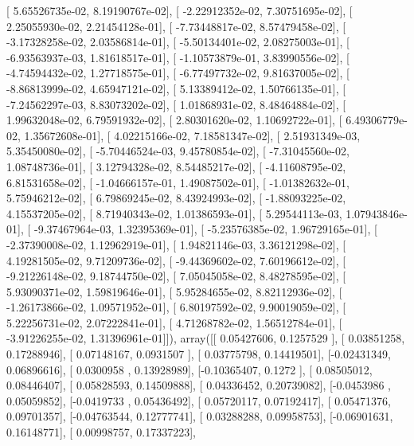 \documentclass{article}
\begin{document}
       [  5.65526735e-02,   8.19190767e-02],
       [ -2.22912352e-02,   7.30751695e-02],
       [  2.25055930e-02,   2.21454128e-01],
       [ -7.73448817e-02,   8.57479458e-02],
       [ -3.17328258e-02,   2.03586814e-01],
       [ -5.50134401e-02,   2.08275003e-01],
       [ -6.93563937e-03,   1.81618517e-01],
       [ -1.10573879e-01,   3.83990556e-02],
       [ -4.74594432e-02,   1.27718575e-01],
       [ -6.77497732e-02,   9.81637005e-02],
       [ -8.86813999e-02,   4.65947121e-02],
       [  5.13389412e-02,   1.50766135e-01],
       [ -7.24562297e-03,   8.83073202e-02],
       [  1.01868931e-02,   8.48464884e-02],
       [  1.99632048e-02,   6.79591932e-02],
       [  2.80301620e-02,   1.10692722e-01],
       [  6.49306779e-02,   1.35672608e-01],
       [  4.02215166e-02,   7.18581347e-02],
       [  2.51931349e-03,   5.35450080e-02],
       [ -5.70446524e-03,   9.45780854e-02],
       [ -7.31045560e-02,   1.08748736e-01],
       [  3.12794328e-02,   8.54485217e-02],
       [ -4.11608795e-02,   6.81531658e-02],
       [ -1.04666157e-01,   1.49087502e-01],
       [ -1.01382632e-01,   5.75946212e-02],
       [  6.79869245e-02,   8.43924993e-02],
       [ -1.88093225e-02,   4.15537205e-02],
       [  8.71940343e-02,   1.01386593e-01],
       [  5.29544113e-03,   1.07943846e-01],
       [ -9.37467964e-03,   1.32395369e-01],
       [ -5.23576385e-02,   1.96729165e-01],
       [ -2.37390008e-02,   1.12962919e-01],
       [  1.94821146e-03,   3.36121298e-02],
       [  4.19281505e-02,   9.71209736e-02],
       [ -9.44369602e-02,   7.60196612e-02],
       [ -9.21226148e-02,   9.18744750e-02],
       [  7.05045058e-02,   8.48278595e-02],
       [  5.93090371e-02,   1.59819646e-01],
       [  5.95284655e-02,   8.82112936e-02],
       [ -1.26173866e-02,   1.09571952e-01],
       [  6.80197592e-02,   9.90019059e-02],
       [  5.22256731e-02,   2.07222841e-01],
       [  4.71268782e-02,   1.56512784e-01],
       [ -3.91226255e-02,   1.31396961e-01]]), array([[ 0.05427606,  0.1257529 ],
       [ 0.03851258,  0.17288946],
       [ 0.07148167,  0.0931507 ],
       [ 0.03775798,  0.14419501],
       [-0.02431349,  0.06896616],
       [ 0.0300958 ,  0.13928989],
       [-0.10365407,  0.1272    ],
       [ 0.08505012,  0.08446407],
       [ 0.05828593,  0.14509888],
       [ 0.04336452,  0.20739082],
       [-0.0453986 ,  0.05059852],
       [-0.0419733 ,  0.05436492],
       [ 0.05720117,  0.07192417],
       [ 0.05471376,  0.09701357],
       [-0.04763544,  0.12777741],
       [ 0.03288288,  0.09958753],
       [-0.06901631,  0.16148771],
       [ 0.00998757,  0.17337223],
\end{document}
